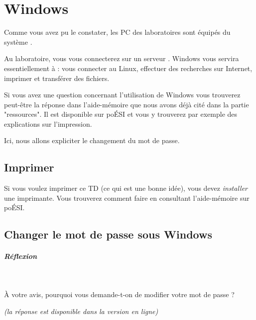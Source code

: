 \documentclass[11pt,a4paper]{article}
\begin{document}
				\section{Windows}
				Comme vous avez pu le constater,
				les PC des laboratoires sont \'equip\'es du
				syst\`eme \verb@Windows@.
			
            \par
        
				Au laboratoire,
				vous vous connecterez sur un serveur 
				\verb@Linux@.
				Windows vous servira essentiellement \`a :
				vous connecter au Linux, 
				effectuer des recherches sur Internet,
				imprimer et transf\'erer des fichiers.
			
            \par
        
				Si vous avez une question concernant 
				l'utilisation de Windows vous trouverez
				peut-\^etre la r\'eponse dans l'aide-m\'emoire
				que nous avons d\'ej\`a cit\'e dans la partie "ressources".
				Il est disponible sur po\'ESI et vous y trouverez
				par exemple des explications sur l'impression.
			
            \par
        
				Ici, nous allons expliciter le changement du mot de passe.
			
            \par
        \subsection{Imprimer}
					Si vous voulez imprimer ce TD
					(ce qui est une bonne id\'ee),
					vous devez 
					\textit{installer}
					une imprimante.
					Vous trouverez comment faire en consultant
					l'aide-m\'emoire sur po\'ESI.
				
            \par
        \subsection{Changer le mot de passe sous Windows}
			
		\subparagraph{R\'eflexion} 
		
					\textcolor{white}{.} \par
				
					\`A votre avis, pourquoi vous demande-t-on de modifier votre mot de passe ?
				
            \par
         {\footnotesize\emph{(la r\'eponse est disponible dans la version en ligne)}\par} 
			
\end{document}
